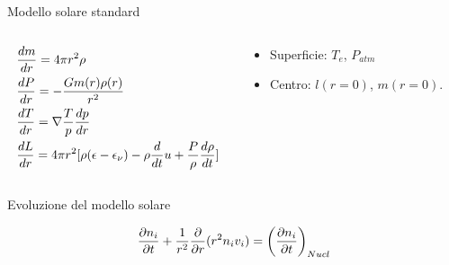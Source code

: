 \documentclass[10pt,xcolor={usenames},fleqn,mathserif,serif]{beamer}
\begin{document}
\begin{frame}{Modello solare standard}

\begin{columns}

\begin{column}{0.6\textwidth}

\begin{subequations}%
\begin{align*}
&\TDy{r}{m}=4\pi r^2\rho\\
&\TDy{r}{P}=-\frac{Gm(r)\rho(r)}{r^2}\\
&\TDy{r}{T}=\nabla\frac{T}{p}\TDy{r}{p}\\
&\TDy{r}{L}=4\pi r^2[\rho(\epsilon-\epsilon_{\nu})-\rho\TDof{t}u+\frac{P}{\rho}\TDy{t}{\rho}]
\end{align*}
\end{subequations}

\end{column}

\begin{column}{0.4\textwidth}
\begin{itemize}
    \item Superficie: $T_e$, $P_{atm}$
    \item Centro: $l(r=0)$, $m(r=0)$.
\end{itemize}

\end{column}

\end{columns}

\begin{block}{Evoluzione del modello solare}

\begin{equation*}
\PDy{t}{n_i}+\frac{1}{r^2}\PDof{r}(r^2n_iv_i)=\Dcvar{\PDy{t}{n_i}}{Nucl}%
\end{equation*}

\end{block}

\end{frame}
\end{document}
